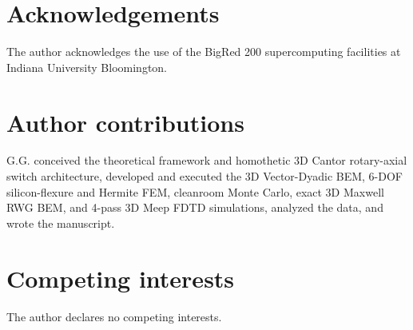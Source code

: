 \documentclass[pdflatex,sn-nature]{sn-jnl}
\begin{document}
\section*{Acknowledgements}
The author acknowledges the use of the BigRed 200 supercomputing facilities at Indiana University Bloomington.

\section*{Author contributions}
G.G. conceived the theoretical framework and homothetic 3D Cantor rotary-axial switch architecture, developed and executed the 3D Vector-Dyadic BEM, 6-DOF silicon-flexure and Hermite FEM, cleanroom Monte Carlo, exact 3D Maxwell RWG BEM, and 4-pass 3D Meep FDTD simulations, analyzed the data, and wrote the manuscript.

\section*{Competing interests}
The author declares no competing interests.



\clearpage
\renewcommand{\thefigure}{\arabic{figure}}
\renewcommand{\theHfigure}{ext.\arabic{figure}}
\renewcommand{\figurename}{Extended Data Fig.}
\setcounter{figure}{0}
\renewcommand{\thetable}{\arabic{table}}
\renewcommand{\theHtable}{ext.\arabic{table}}
\renewcommand{\tablename}{Extended Data Table}
\setcounter{table}{0}
\end{document}

